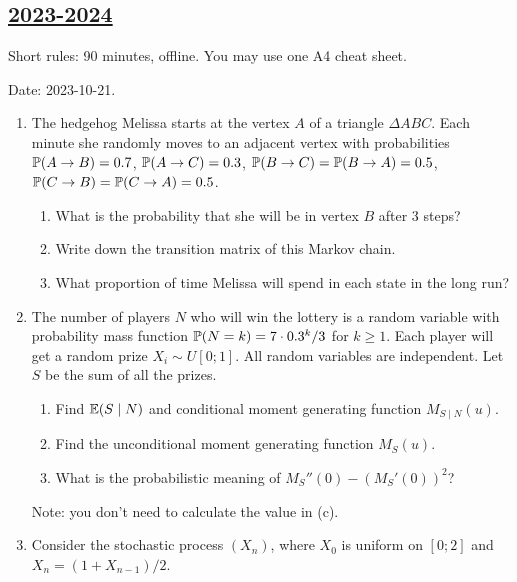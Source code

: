 \subsection[2023-2024]{\hyperref[sec:sol_kr_01_2023_2024]{2023-2024}}
\label{sec:kr_01_2023_2024} %

Short rules: 90 minutes, offline. You may use one A4 cheat sheet.

Date: 2023-10-21.


\begin{enumerate} %
  \item The hedgehog Melissa starts at the vertex $A$ of a triangle $\Delta ABC$.
  Each minute she randomly moves to an adjacent vertex with probabilities $\P(A \to B) = 0.7$, 
  $\P(A \to C) = 0.3$, $\P(B \to C) = \P(B \to A) = 0.5$,  $\P(C \to B) = \P(C \to A) = 0.5$.

  \begin{enumerate}
    \item What is the probability that she will be in vertex $B$ after 3 steps?
    \item Write down the transition matrix of this Markov chain. 
    \item What proportion of time Melissa will spend in each state in the long run?
  \end{enumerate}
  
  \item The number of players $N$ who will win the lottery
  is a random variable with probability mass function $\P(N = k) = 7\cdot 0.3^k / 3$ for $k\geq 1$.
  Each player will get a random prize $X_i \sim U[0;1]$.
  All random variables are independent. 
  Let $S$ be the sum of all the prizes. 

  \begin{enumerate}
    \item Find $\E(S \mid N)$ and conditional moment generating function $M_{S\mid N}(u)$.
    \item Find the unconditional moment generating function $M_S(u)$.
    \item What is the probabilistic meaning of $M_S''(0) - (M_S'(0))^2$? 
  \end{enumerate}

  Note: you don't need to calculate the value in (c). 
  
  \item Consider the stochastic process $(X_n)$, where $X_0$ is uniform on $[0;2]$ and
  $X_n = (1 + X_{n-1}) / 2$.


\end{enumerate}
